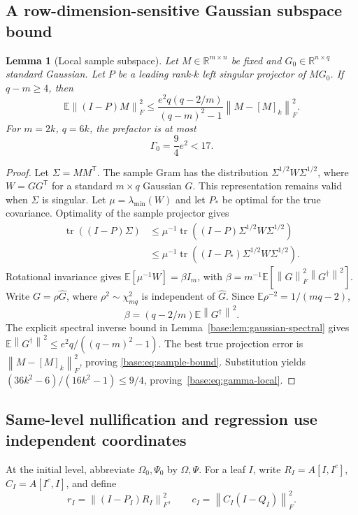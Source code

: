 \documentclass[11pt,oneside,openany,a4paper]{book}
\numberwithin{equation}{chapter}
\newtheorem{lemma}[theorem]{Lemma}
\theoremstyle{definition}
\theoremstyle{remark}
\newcommand{\R}{\mathbb R}\newcommand{\E}{\mathbb E}\newcommand{\Prb}{\mathbb P}\newcommand{\PP}{\mathbb P}
\newcommand{\T}{\mathsf T}\newcommand{\Id}{I}
\newcommand{\F}[1]{\left\lVert#1\right\rVert_F}
\newcommand{\N}[1]{\left\lVert#1\right\rVert}
\DeclareMathOperator{\tr}{tr}\DeclareMathOperator{\rank}{rank}
\begin{document}
\subsection{A row-dimension-sensitive Gaussian subspace bound}
\begin{lemma}[Local sample subspace]\label{base:lem:sample-subspace}
Let $M\in\R^{m\times n}$ be fixed and $G_0\in\R^{n\times q}$ standard
Gaussian. Let $P$ be a leading rank-$k$ left singular projector of $MG_0$.
If $q-m\ge4$, then
\begin{equation}\label{base:eq:sample-bound}
 \E\F{(I-P)M}^2
 \le\frac{e^2q(q-2/m)}{(q-m)^2-1}\F{M-[M]_k}^2.
\end{equation}
For $m=2k$, $q=6k$, the prefactor is at most
\begin{equation}\label{base:eq:gamma-local}
 \Gamma_0=\frac94e^2<17.
\end{equation}
\end{lemma}
\begin{proof}
Let $\Sigma=MM^{\T}$. The sample Gram has the distribution
$\Sigma^{1/2}W\Sigma^{1/2}$, where $W=GG^{\T}$ for a standard
$m\times q$ Gaussian $G$. This representation remains valid when
$\Sigma$ is singular. Let $\mu=\lambda_{\min}(W)$ and let $P_*$ be optimal
for the true covariance. Optimality of the sample projector gives
\begin{align*}
 \tr((I-P)\Sigma)
 &\le\mu^{-1}\tr((I-P)\Sigma^{1/2}W\Sigma^{1/2})\\
 &\le\mu^{-1}\tr((I-P_*)\Sigma^{1/2}W\Sigma^{1/2}).
\end{align*}
Rotational invariance gives
$\E[\mu^{-1}W]=\beta I_m$, with
$\beta=m^{-1}\E[\F G^2\N{G^\dagger}^2]$.
Write $G=\rho\widehat G$, where $\rho^2\sim\chi^2_{mq}$ is independent of
$\widehat G$. Since $\E\rho^{-2}=1/(mq-2)$,
\[
 \beta=(q-2/m)\E\N{G^\dagger}^2.
\]
The explicit spectral inverse bound in
Lemma~\ref{base:lem:gaussian-spectral} gives
$\E\N{G^\dagger}^2\le e^2q/((q-m)^2-1)$.
The best true projection error is $\F{M-[M]_k}^2$, proving
\eqref{base:eq:sample-bound}. Substitution yields
$(36k^2-6)/(16k^2-1)\le9/4$, proving~\eqref{base:eq:gamma-local}.
\end{proof}

\subsection{Same-level nullification and regression use independent coordinates}
At the initial level, abbreviate $\Omega_0,\Psi_0$ by $\Omega,\Psi$.
For a leaf $I$, write $R_I=A[I,I^c]$, $C_I=A[I^c,I]$, and define
\begin{equation}\label{base:eq:r-c-local}
 r_I=\F{(I-P_I)R_I}^2,\qquad
 c_I=\F{C_I(I-Q_I)}^2.
\end{equation}
\end{document}

